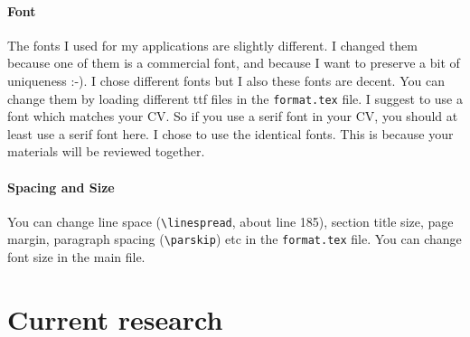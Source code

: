 \begin{minipage}[t]{504pt}
\begin{minipage}[t]{350pt}
\paragraph{Font} The fonts I used for my applications are slightly different.  I changed them because one of them is a commercial font, and because I want to preserve a bit of uniqueness :-). I chose different fonts but I also these fonts are decent. You can change them by loading different ttf files in the \verb|format.tex| file.
I suggest to use a font which matches your CV. So  if you use a serif font in your CV, you should at least use a serif font here. I chose to use the identical fonts. This is because your materials will be reviewed together. 

\paragraph{Spacing and Size} You can change line space  (\verb|\linespread|, about line 185), section title size, page margin, paragraph spacing (\verb|\parskip|) etc in the \verb|format.tex| file.
You can change font size in the main file. 

\section{Current research}

\lipsum[1]

\lipsum[13]


\end{minipage}
\end{minipage}

